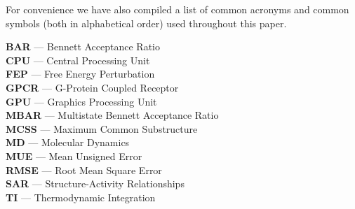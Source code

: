 \documentclass[9pt,bestpractices]{livecoms}
\begin{document}
For convenience we have also compiled a list of common acronyms and common symbols (both in alphabetical order) used throughout this paper.
\begin{tcolorbox}[title=Acronyms, colback=blue!10!white]
    {\bf BAR} --- Bennett Acceptance Ratio\\
    {\bf CPU} --- Central Processing Unit\\
     {\bf FEP} --- Free Energy Perturbation\\
     {\bf GPCR} --- G-Protein Coupled Receptor\\
     {\bf GPU} --- Graphics Processing Unit\\
     {\bf MBAR} --- Multistate Bennett Acceptance Ratio\\
     {\bf MCSS} --- Maximum Common Substructure\\
     {\bf MD} --- Molecular Dynamics\\
     {\bf MUE} --- Mean Unsigned Error\\
     {\bf RMSE} --- Root Mean Square Error\\
     {\bf SAR} --- Structure-Activity Relationships\\
     {\bf TI} --- Thermodynamic Integration
\end{tcolorbox}
\end{document}
